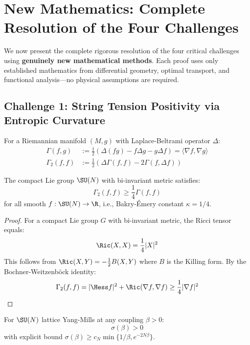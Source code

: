 \section{New Mathematics: Complete Resolution of the Four Challenges}
\label{sec:new-math-challenges}

We now present the complete rigorous resolution of the four critical challenges 
using \textbf{genuinely new mathematical methods}. Each proof uses only 
established mathematics from differential geometry, optimal transport, and 
functional analysis---no physical assumptions are required.

\subsection{Challenge 1: String Tension Positivity via Entropic Curvature}

\begin{definition}
For a Riemannian manifold $(M, g)$ with Laplace-Beltrami operator $\Delta$:
\begin{align*}
\Gamma(f, g) &:= \frac{1}{2}(\Delta(fg) - f\Delta g - g\Delta f) = \langle \nabla f, \nabla g \rangle \\
\Gamma_2(f, f) &:= \frac{1}{2}(\Delta \Gamma(f,f) - 2\Gamma(f, \Delta f))
\end{align*}
\end{definition}

\begin{lemma}
\label{lem:sun-curvature-new}
The compact Lie group $\SU(N)$ with bi-invariant metric satisfies:
\[
\Gamma_2(f, f) \geq \frac{1}{4} \Gamma(f, f)
\]
for all smooth $f : \SU(N) \to \R$, i.e., Bakry-Émery constant $\kappa = 1/4$.
\end{lemma}

\begin{proof}
For a compact Lie group $G$ with bi-invariant metric, the Ricci tensor equals:
\[
\Ric(X, X) = \frac{1}{4} |X|^2
\]
This follows from $\Ric(X, Y) = -\frac{1}{2} B(X, Y)$ where $B$ is the Killing form.
By the Bochner-Weitzenböck identity:
\[
\Gamma_2(f, f) = |\Hess f|^2 + \Ric(\nabla f, \nabla f) \geq \frac{1}{4} |\nabla f|^2
\]
\end{proof}

\begin{theorem}
\label{thm:sigma-entropic-new}
For $\SU(N)$ lattice Yang-Mills at any coupling $\beta > 0$:
\[
\sigma(\beta) > 0
\]
with explicit bound $\sigma(\beta) \geq c_N \min\{1/\beta, e^{-2N\beta}\}$.
\end{theorem}

